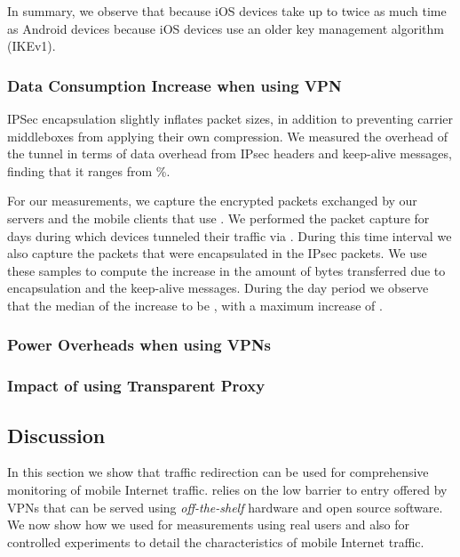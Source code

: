In summary, we observe that because iOS devices take up to twice as much time as Android devices because iOS devices use an older key management algorithm (IKEv1). 

\subsubsection{Data Consumption Increase when using VPN}
IPSec encapsulation slightly inflates packet sizes, in addition to preventing carrier middleboxes from applying their own compression.
We measured the overhead of the tunnel in terms of data overhead from IPsec headers and keep-alive messages, finding that it
ranges from \%.

For our measurements, we capture the encrypted packets exchanged by our \platname servers and the mobile clients that use \platname. 
We performed the packet capture for  days during which  devices tunneled their traffic via  \platname. 
During this time interval we also capture the packets that were encapsulated in the IPsec packets. 
We use these samples to compute the increase in the amount of bytes transferred due to encapsulation and the keep-alive
messages. 
During the  day period we observe that the median of the increase to be , with a maximum increase of .


\subsubsection{Power Overheads when using VPNs}


\subsubsection{Impact of using Transparent Proxy}


\subsection{Discussion}

In this section we show that traffic redirection can be used for comprehensive monitoring of mobile Internet traffic.
\platname relies on the low barrier to entry offered by VPNs that can be served using \emph{off-the-shelf} hardware and open source software. 
We now show how we used \platname for measurements using real users and also for  controlled experiments to detail the characteristics of mobile Internet traffic. 




